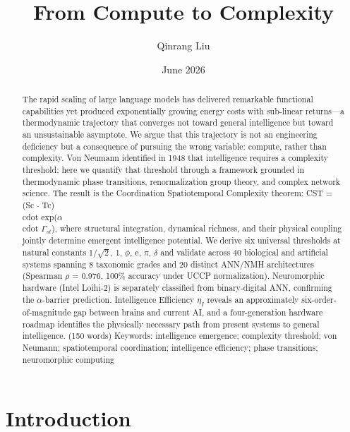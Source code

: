 \documentclass[a4paper,12pt]{article}
\title{From Compute to Complexity}
\author{Qinrang Liu}
\date{June 2026}
\begin{document}
\maketitle
\begin{abstract}
The rapid scaling of large language models has delivered remarkable functional capabilities yet produced exponentially growing energy costs with sub-linear returns---a thermodynamic trajectory that converges not toward general intelligence but toward an unsustainable asymptote. We argue that this trajectory is not an engineering deficiency but a consequence of pursuing the wrong variable: compute, rather than complexity. Von Neumann identified in 1948 that intelligence requires a complexity threshold; here we quantify that threshold through a framework grounded in thermodynamic phase transitions, renormalization group theory, and complex network science. The result is the Coordination Spatiotemporal Complexity theorem: CST = (Sc $\cdot$ Tc)  \\cdot  exp($\alpha$  \\cdot  $\Gamma_{st}$), where structural integration, dynamical richness, and their physical coupling jointly determine emergent intelligence potential. We derive six universal thresholds at natural constants {1/$\sqrt{2}$, 1, $\phi$, e, $\pi$, $\delta$} and validate across 40 biological and artificial systems spanning 8 taxonomic grades and 20 distinct ANN/NMH architectures (Spearman $\rho$ = 0.976, 100\% accuracy under UCCP normalization). Neuromorphic hardware (Intel Loihi-2) is separately classified from binary-digital ANN, confirming the $\alpha$-barrier prediction. Intelligence Efficiency $\eta_{I}$ reveals an approximately six-order-of-magnitude gap between brains and current AI, and a four-generation hardware roadmap identifies the physically necessary path from present systems to general intelligence. (150 words) Keywords: intelligence emergence; complexity threshold; von Neumann; spatiotemporal coordination; intelligence efficiency; phase transitions; neuromorphic computing
\end{abstract}

\section{Introduction}
\end{document}
